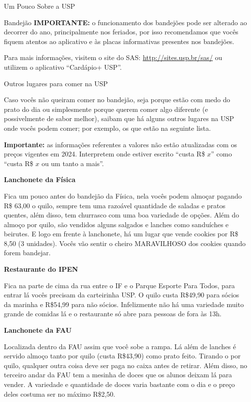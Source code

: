 \begin{secao}{Um Pouco Sobre a USP}
\begin{subsecao}{Bandejão}
\textbf{IMPORTANTE:} o funcionamento dos bandejões pode ser alterado ao decorrer do ano,
principalmente nos feriados, por isso recomendamos que vocês fiquem atentos ao 
aplicativo e às placas informativas presentes nos bandejões.

Para mais informações, visitem o site do SAS: \url{http://sites.usp.br/sas/} ou
utilizem o aplicativo ``Cardápio+ USP''.

\end{subsecao}

\begin{subsecao}{Outros lugares para comer na USP}

Caso vocês não queiram comer no bandejão, seja porque estão com medo do
prato do dia ou simplesmente porque querem comer algo diferente (e
possivelmente de sabor melhor), saibam que há alguns outros lugares na USP onde
vocês podem comer; por exemplo, os que estão na seguinte lista.

\textbf{Importante:} as informações referentes a valores não estão atualizadas com
os preços vigentes em 2024. Interpretem onde estiver escrito ``custa R\$ $x$'' 
como ``custa R\$ $x$ ou um tanto a mais''.

\textbf{Lanchonete da Física}

Fica um pouco antes do bandejão da Física, nela vocês podem almoçar pagando R\$
63,00 o quilo, sempre tem uma razoável quantidade de saladas e pratos
quentes, além disso, tem churrasco com uma boa variedade de opções.
Além do almoço por quilo, são vendidos alguns salgados e lanches como sanduíches e
beirutes. E logo em frente à lanchonete, há um lugar que vende cookies por R\$
8,50 (3 unidades). Vocês vão sentir o cheiro MARAVILHOSO dos cookies quando forem bandejar.

\textbf{Restaurante do IPEN}

Fica na parte de cima da rua entre o IF e o Parque Esporte Para Todos, para
entrar lá vocês precisam da carteirinha USP. O quilo custa R\$49,90 para sócios da marinha 
e R\$54,99 para não sócios. Infelizmente não há uma variedade muito grande de comidas lá e o
restaurante só abre para pessoas de fora às 13h.

\textbf{Lanchonete da FAU}

Localizada dentro da FAU assim que você sobe a rampa. Lá além de lanches é
servido almoço tanto por quilo (custa R\$43,90) como prato feito. Tirando o por
quilo, qualquer outra coisa deve ser paga no caixa antes de retirar. %
Além disso, no terceiro andar da FAU tem a mesinha de doces que os alunos deixam lá
para vender. A variedade e quantidade de doces varia bastante com o dia e o
preço deles costuma ser no máximo R\$2,50.


\end{subsecao}
\end{secao}
